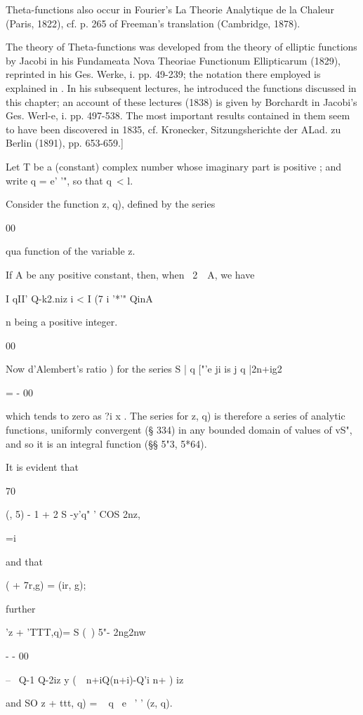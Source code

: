 %
%

Theta-functions also occur in Fourier's La Theorie Analytique de la
Chaleur (Paris, 1822), cf. p. 265 of Freeman's translation (Cambridge,
1878).

The theory of Theta-functions was developed from the theory of
elliptic functions by Jacobi in his Fundameata Nova Theoriae
Functionum Ellipticarum (1829), reprinted in his Ges. Werke, i. pp.
49-239; the notation there employed is explained in . In his
subsequent lectures, he introduced the functions discussed in this
chapter; an account of these lectures (1838) is given by Borchardt in
Jacobi's Ges. Werl-e, i. pp. 497-538. The most important results
contained in them seem to have been discovered in 1835, cf. Kronecker,
Sitzungsherichte der ALad. zu Berlin (1891), pp. 653-659.]

Let T be a (constant) complex number whose imaginary part is positive
; and write q = e' '", so that q\ < l.

Consider the function z, q), defined by the series

00

qua function of the variable z.

If A be any positive constant, then, when \ 2\ \ A, we have

I qII' Q-k2.niz i < I (7 i '*'" QinA

n being a positive integer.

00

Now d'Alembert's ratio ) for the series S | q ["'e ji is j q
|2n+ig2

  = - 00

which tends to zero as ?i x . The series for z, q) is therefore a
series of analytic functions, uniformly convergent (§ 334) in any
bounded domain of values of vS", and so it is an integral function (§§
5"3, 5*64).

It is evident that

 70

  (, 5) - 1 + 2 S -y'q" ' COS 2nz,

 =i

and that

 ( + 7r,g) = (ir, g);

further

'z + 'TTT,q)= S (\ ) 5"- 2ng2nw

 - - 00

-- \ Q-1 Q-2iz y (\ \ n+iQ(n+i)-Q'i n+ ) iz

and SO z + ttt, q) = ~ q~ e~ ' ' (z, q).

